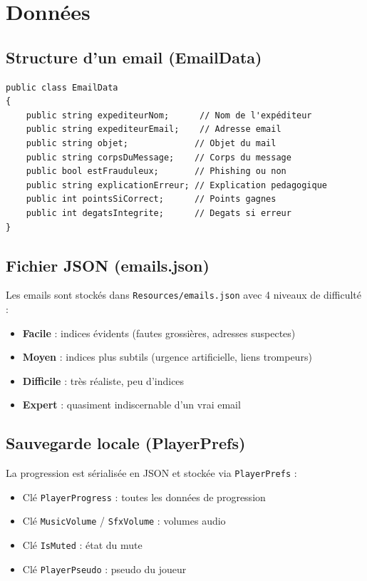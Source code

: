 \documentclass[12pt,a4paper]{article}
\begin{document}
\section{Données}

\subsection{Structure d'un email (EmailData)}
\begin{lstlisting}
public class EmailData
{
    public string expediteurNom;      // Nom de l'expéditeur
    public string expediteurEmail;    // Adresse email
    public string objet;             // Objet du mail
    public string corpsDuMessage;    // Corps du message
    public bool estFrauduleux;       // Phishing ou non
    public string explicationErreur; // Explication pedagogique
    public int pointsSiCorrect;      // Points gagnes
    public int degatsIntegrite;      // Degats si erreur
}
\end{lstlisting}

\subsection{Fichier JSON (emails.json)}
Les emails sont stockés dans \texttt{Resources/emails.json} avec 4 niveaux de difficulté :
\begin{itemize}
    \item \textbf{Facile} : indices évidents (fautes grossières, adresses suspectes)
    \item \textbf{Moyen} : indices plus subtils (urgence artificielle, liens trompeurs)
    \item \textbf{Difficile} : très réaliste, peu d'indices
    \item \textbf{Expert} : quasiment indiscernable d'un vrai email
\end{itemize}

\subsection{Sauvegarde locale (PlayerPrefs)}
La progression est sérialisée en JSON et stockée via \texttt{PlayerPrefs} :
\begin{itemize}
    \item Clé \texttt{PlayerProgress} : toutes les données de progression
    \item Clé \texttt{MusicVolume} / \texttt{SfxVolume} : volumes audio
    \item Clé \texttt{IsMuted} : état du mute
    \item Clé \texttt{PlayerPseudo} : pseudo du joueur
\end{itemize}
\end{document}
